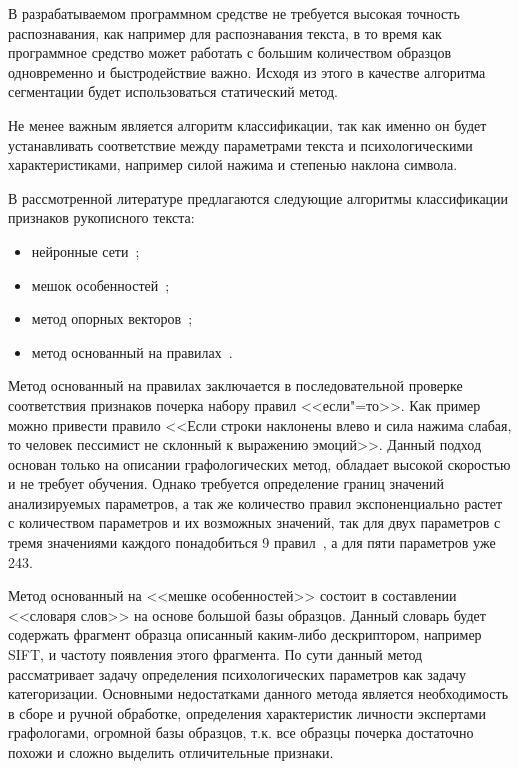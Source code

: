 В разрабатываемом программном средстве не требуется высокая точность распознавания, как например для распознавания текста, в то время как программное средство может работать с большим количеством образцов одновременно и быстродействие важно. Исходя из этого в качестве алгоритма сегментации будет использоваться статический метод.

Не менее важным является алгоритм классификации, так как именно он будет устанавливать соответствие между параметрами текста и психологическими характеристиками, например силой нажима и степенью наклона символа.

В рассмотренной литературе предлагаются следующие алгоритмы классификации признаков рукописного текста:
\begin{itemize}
  \item нейронные сети~\cite{champa_ananda_kumar_ann, grewal_prashar, gabrani_solomon_dviwe,puri_lakhwani, dang_kumar, kathait_singh};
  \item мешок особенностей~\cite{rothacker_bag_of_features};
  \item метод опорных векторов~\cite{slideshare_khandelwal_garg, gabrani_solomon_dviwe, prasad_singh_sapre};
  \item метод основанный на правилах~\cite{champa_ananda_kumar_rule_base}.
\end{itemize}

Метод основанный на правилах заключается в последовательной проверке соответствия признаков почерка набору правил <<если"=то>>. Как пример можно привести правило <<Если строки наклонены влево и сила нажима слабая, то человек пессимист не склонный к выражению эмоций>>. Данный подход основан только на описании графологических метод, обладает высокой скоростью и не требует обучения. Однако требуется определение границ значений анализируемых параметров, а так же количество правил экспоненциально растет с количеством параметров и их возможных значений, так для двух параметров с тремя значениями каждого понадобиться 9 правил~\cite{champa_ananda_kumar_rule_base}, а для пяти параметров уже 243.

Метод основанный на <<мешке особенностей>> состоит в составлении <<словаря слов>> на основе большой базы образцов. Данный словарь будет содержать фрагмент образца описанный каким-либо дескриптором, например SIFT, и частоту появления этого фрагмента. По сути данный метод рассматривает задачу определения психологических параметров как задачу категоризации. Основными недостатками данного метода является необходимость в сборе и ручной обработке, определения характеристик личности экспертами графологами, огромной базы образцов, т.к. все образцы почерка достаточно похожи и сложно выделить отличительные признаки.

